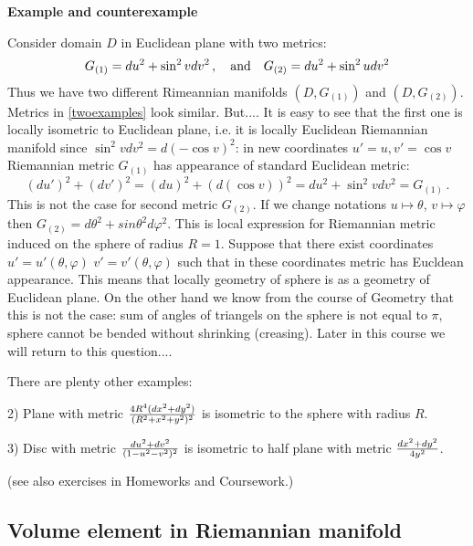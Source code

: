 \documentclass[12pt]{article}
\theoremstyle{theorem}
\numberwithin{equation}{section}
\begin{document}
\m

{\bf Example and counterexample}

  Consider domain $D$ in Euclidean plane with two metrics:
              \begin{equation}\label{twoexamples}
    G_{(1)}=du^2+\sin^2v dv^2\,,\quad {\rm and}\quad
    G_{(2)}=du^2+\sin^2u dv^2
              \end{equation}
Thus we have two different Rimeannian manifolds $(D,G_{(1)})$
and $(D, G_{(2)})$.
Metrics in \eqref{twoexamples} look similar. But....
It is easy to see that the first one is locally
isometric to Euclidean plane, i.e. it is locally Euclidean Riemannian manifold
since $\sin^2 vdv^2=d(-\cos v)^2$: in new coordinates
$u'=u,v'=\cos v$ Riemannian metric $G_{(1)}$ has appearance of standard
Euclidean metric:
            $$
(du')^2+(dv')^2=(du)^2+(d(\cos v))^2=du^2+\sin^2 vdv^2=G_{(1)}\,.
            $$
This is not the case for second metric $G_{(2)}$. If we change notations
$u\mapsto \theta$, $v\mapsto \varphi$ then
 $G_{(2)}=d\theta^2+sin\theta^2 d\varphi^2$.
This is local
expression for Riemannian metric induced on the sphere of radius $R=1$.
Suppose that there exist coordinates $u'=u'(\theta,\varphi)$
 $v'=v'(\theta,\varphi)$ such that in these coordinates
metric has Eucldean appearance. This means that locally geometry of
sphere is as  a geometry of Euclidean plane.
On the other hand we know from the course of Geometry
that this is not the case:
sum of angles of triangels on the sphere is not equal to $\pi$,
sphere cannot be bended without shrinking (creasing). 
Later in this course we will
return to this question....

     \m

   There are plenty other examples:

      2) Plane with metric $4R^4(dx^2+dy^2)\over (R^2+x^2+y^2)^2$
is isometric to the sphere with radius $R$.

    3) Disc with metric $du^2+dv^2\over (1-u^2-v^2)^2$ is isometric to half plane with metric $dx^2+dy^2\over 4y^2$.

(see also exercises in Homeworks and Coursework.)








    \subsection {Volume element in Riemannian manifold}
\end{document}
